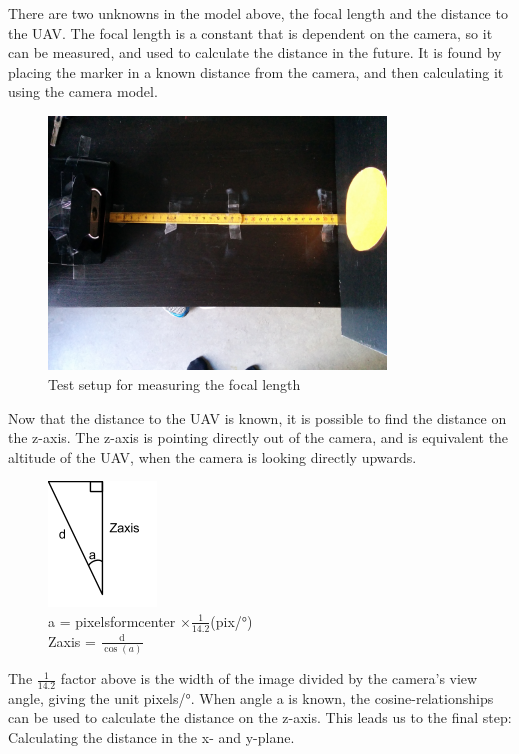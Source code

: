 There are two unknowns in the model above, the focal length and the distance to the UAV. The focal length is a constant that is dependent on the camera, so it can be measured, and used to calculate the distance in the future. It is found by placing the marker in a known distance from the camera, and then calculating it using the camera model.

\begin{figure}[h!]
	\centering
	\includegraphics[width=0.8\textwidth]{imgs/focal_length_test}
	\caption{Test setup for measuring the focal length}
\end{figure}

Now that the distance to the UAV is known, it is possible to find the distance on the z-axis. The z-axis is pointing directly out of the camera, and is equivalent the altitude of the UAV, when the camera is looking directly upwards. 

\begin{figure}[h!]
	\centering
	\includegraphics{imgs/focal_length_z_length}\\
	a = pixelsformcenter $ \times \frac{1}{14.2}$(pix/\si{\degree})\\
	Zaxis = $\frac{\mathrm{d}}{\cos{(a)}}$
\end{figure}

The $\frac{1}{14.2}$ factor above is the width of the image divided by the camera's view angle, giving the unit pixels/\si{\degree}. When angle a is known, the cosine-relationships can be used to calculate the distance on the z-axis. This leads us to the final step: Calculating the distance in the x- and y-plane.
 

